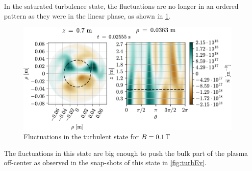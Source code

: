In the saturated turbulence state, the fluctuations are no longer in an ordered pattern as they were in the linear phase, as shown in \cref{fig:2DFluct}.
%
\begin{figure}[htb]
    \centering
    \includegraphics{fig/results/2DTurbulence/fluct}
    \caption{Fluctuations in the turbulent state for $B=0.1\, \text{T}$}
    \label{fig:2DFluct}
\end{figure}
%
The fluctuations in this state are big enough to push the bulk part of the plasma off-center as observed in the snap-shots of this state in \cref{fig:turbEv}.
%
